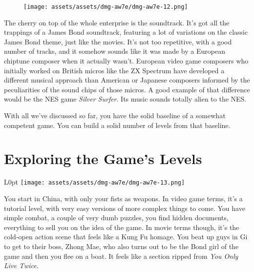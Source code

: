 \documentclass{book}
\begin{document}
\begin{figure}[hbt]
\vskip 10pt
\centering \texttt{[image: assets/assets/dmg-aw7e/dmg-aw7e-12.png]}
\vskip 6pt
\end{figure}
The cherry on top of the whole enterprise is the soundtrack. It’s got all the trappings of a James Bond soundtrack, featuring a lot of variations on the classic James Bond theme, just like the movies. It’s not too repetitive, with a good number of tracks, and it somehow sounds like it was made by a European chiptune composer when it actually wasn’t. European video game composers who initially worked on British micros like the ZX Spectrum have developed a different musical approach than American or Japanese composers informed by the peculiarities of the sound chips of those micros. A good example of that difference would be the NES game \emph{Silver Surfer}. Its music sounds totally alien to the NES.

With all we’ve discussed so far, you have the solid baseline of a somewhat competent game. You can build a solid number of levels from that baseline.

\FloatBarrier\needspace{10mm}\section*{Exploring the Game’s Levels}\nopagebreak[4]

\begin{wrapfigure}{L}{0pt} \texttt{[image: assets/assets/dmg-aw7e/dmg-aw7e-13.png]}\end{wrapfigure}
You start in China, with only your fists as weapons. In video game terms, it’s a tutorial level, with very easy versions of more complex things to come. You have simple combat, a couple of very dumb puzzles, you find hidden documents, everything to sell you on the idea of the game. In movie terms though, it’s the cold-open action scene that feels like a Kung Fu homage. You beat up guys in Gi to get to their boss, Zhong Mae, who also turns out to be the Bond girl of the game and then you flee on a boat. It feels like a section ripped from \emph{You Only Live Twice}.
\end{document}
